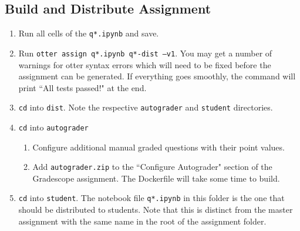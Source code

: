 \documentclass[12pt]{article}
\begin{document}
\subsection*{Build and Distribute Assignment}
\begin{enumerate}[font=\bfseries]
    \item Run all cells of the \texttt{q*.ipynb} and save.
    \item Run \texttt{otter assign q*.ipynb q*-dist --v1}. You may get a number of warnings for otter syntax errors which will need to be fixed before the assignment can be generated. If everything goes smoothly, the command will print ``All tests passed!" at the end.
    \item \texttt{cd} into \texttt{dist}. Note the respective \texttt{autograder} and \texttt{student} directories.
    \item \texttt{cd} into \texttt{autograder}
    \begin{enumerate}
        \item Configure additional manual graded questions with their point values.
        \item Add \texttt{autograder.zip} to the ``Configure Autograder" section of the Gradescope assignment. The Dockerfile will take some time to build.
    \end{enumerate}
    \item \texttt{cd} into \texttt{student}. The notebook file \texttt{q*.ipynb} in this folder is the one that should be distributed to students. Note that this is distinct from the master assignment with the same name in the root of the assignment folder.
    

\end{enumerate}
    
\end{document}
